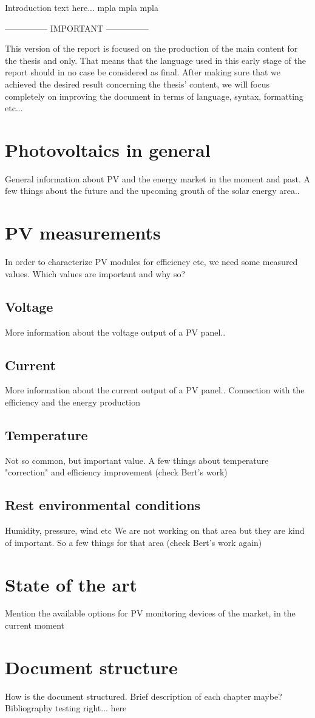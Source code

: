 Introduction text here... mpla mpla mpla

\par
--------------- IMPORTANT --------------- \par 
This version of the report is focused on the production of the main content for the thesis and only. That means that the language used in this early stage of the report should in no case be considered as final. After making sure that we achieved the desired result concerning the thesis' content, we will focus completely on improving the document in terms of language, syntax, formatting etc...
\par

\section{Photovoltaics in general}
General information about PV and the energy market in the moment and past. A few things about the future and the upcoming grouth of the solar energy area..

\section{PV measurements}
In order to characterize PV modules for efficiency etc, we need some measured values. Which values are important and why so?

\subsection{Voltage}
More information about the voltage output of a PV panel..

\subsection{Current}
More information about the current output of a PV panel.. Connection with the efficiency and the energy production

\subsection{Temperature}
Not so common, but important value. A few things about temperature "correction" and efficiency improvement (check Bert's work)

\subsection{Rest environmental conditions}
Humidity, pressure, wind etc
We are not working on that area but they are kind of important. So a few things for that area (check Bert's work again)

\section{State of the art}
Mention the available options for PV monitoring devices of the market, in the current moment

\section{Document structure}
How is the document structured. Brief description of each chapter maybe?\\
Bibliography testing right... here\cite{einstein}
